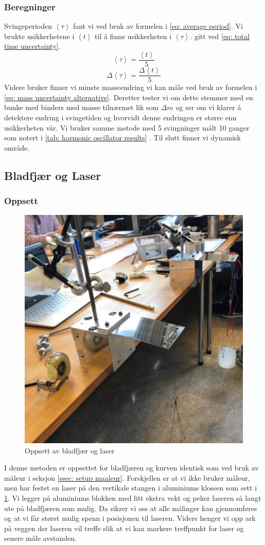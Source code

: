\documentclass[reprint,norsk,notitlepage]{revtex4-2}
\begin{document}
\subsubsection{Beregninger}
Svingeperioden $\left<τ\right>$ fant vi ved bruk av formelen i \cref{eq: average period}. Vi brukte usikkerhetene i $\left<t\right>$ til å finne usikkerheten i $\left<τ\right>$. gitt ved \cref{eq: total time uncertainty}.
\begin{equation}\label{eq: average period}
    \left<τ\right> = \frac{\left<t\right>}{5}  
\end{equation}
\begin{equation}\label{eq: total time uncertainty}
    Δ\left<τ\right> = \frac{Δ\left<t\right>}{5}
\end{equation}
Videre bruker finner vi minste masseendring vi kan måle ved bruk av formelen i \cref{eq: mass uncertainty alternative}. Deretter tester vi om dette stemmer med en bunke med binders med masse tilnærmet lik som $Δm$ og ser om vi klarer å detektere endring i svingetiden og hvorvidt denne endringen er større enn usikkerheten vår. Vi bruker samme metode med 5 svingninger målt 10 ganger som notert i \cref{tab: harmonic oscillator results}
. Til slutt finner vi dynamisk område. 

\subsection{Bladfjær og Laser}
\subsubsection{Oppsett}
\begin{figure}[h!]
  \centering
  \includegraphics[width = .25\textwidth]{fig/laser_oppsett.png}
  \caption{Oppsett av bladfjær og laser}
  \label{fig: oppsett laser}
\end{figure}

I denne metoden er oppsettet for bladfjæren og kurven identisk som ved bruk av måleur i seksjon \ref{ssec: setup maaleur}. Forskjellen er at vi ikke bruker måleur, men har festet en laser på den vertikale stangen i aluminiums klossen som sett i \cref{fig: oppsett laser}. Vi legger på aluminiums blokken med litt ekstra vekt og peker laseren så langt ute på bladfjæren som mulig. Da sikrer vi oss at alle målinger kan gjennomføres og at vi får størst mulig spenn i posisjonen til laseren. Videre henger vi opp ark på veggen der laseren vil treffe slik at vi kan markere treffpunkt for laser og senere måle avstanden. 
\end{document}
